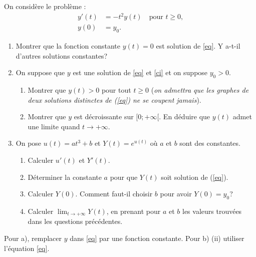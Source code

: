 \documentclass[11pt,class=report,crop=false]{standalone}
\begin{document}
\exercice{}
\enonce
On considère le problème :
\begin{align}
  y'(t) &= -t^2 y(t) \quad \text{pour $t \geq 0$,} \label{eq}\\
  y(0) &= y_0. \label{ci}
\end{align}
\begin{enumerate}
  \item Montrer que la fonction constante $y(t)=0$ est solution de \eqref{eq}.
  Y a-t-il d'autres solutions constantes?
  \item On suppose que $y$ est une solution de \eqref{eq} et \eqref{ci} et on suppose $y_0>0$.
  \begin{enumerate}
    \item Montrer que $y(t)>0$ pour tout $t\ge 0$ ({\it on admettra que les graphes de deux solutions distinctes de (\ref{eq}) ne se coupent jamais}).
    \item Montrer que $y$ est décroissante sur $[0; +\infty[$.
    En déduire que $y(t)$ admet une limite quand $t \to +\infty$.
  \end{enumerate}
  \item On pose $u(t)=at^3+b$ et $Y(t)=e^{u(t)}$ où $a$ et $b$ sont des constantes.
  \begin{enumerate}
    \item Calculer $u'(t)$ et $Y'(t)$.
    \item Déterminer la constante $a$ pour que $Y(t)$ soit solution de (\ref{eq}).
    \item Calculer $Y(0)$.
    Comment faut-il choisir $b$ pour avoir $Y(0)=y_0$?
    \item Calculer $\lim_{t\to +\infty}Y(t)$, en prenant pour $a$ et $b$ les valeurs trouvées dans les questions précédentes.
  \end{enumerate}
\end{enumerate}
\finenonce

\indication
Pour a), remplacer $y$ dans \eqref{eq} par une fonction constante.
Pour b) (ii) utiliser l'équation \eqref{eq}.
\finindication

\correction

\end{document}
